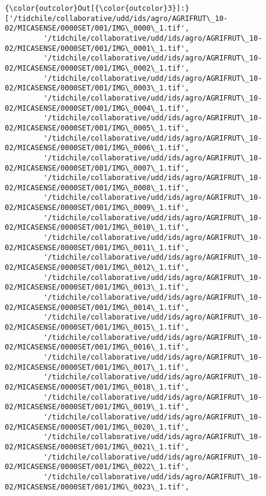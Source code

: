 \documentclass[11pt]{article}
\begin{document}
\begin{Verbatim}[commandchars=\\\{\}]
{\color{outcolor}Out[{\color{outcolor}3}]:} ['/tidchile/collaborative/udd/ids/agro/AGRIFRUT\_10-02/MICASENSE/0000SET/001/IMG\_0000\_1.tif',
         '/tidchile/collaborative/udd/ids/agro/AGRIFRUT\_10-02/MICASENSE/0000SET/001/IMG\_0001\_1.tif',
         '/tidchile/collaborative/udd/ids/agro/AGRIFRUT\_10-02/MICASENSE/0000SET/001/IMG\_0002\_1.tif',
         '/tidchile/collaborative/udd/ids/agro/AGRIFRUT\_10-02/MICASENSE/0000SET/001/IMG\_0003\_1.tif',
         '/tidchile/collaborative/udd/ids/agro/AGRIFRUT\_10-02/MICASENSE/0000SET/001/IMG\_0004\_1.tif',
         '/tidchile/collaborative/udd/ids/agro/AGRIFRUT\_10-02/MICASENSE/0000SET/001/IMG\_0005\_1.tif',
         '/tidchile/collaborative/udd/ids/agro/AGRIFRUT\_10-02/MICASENSE/0000SET/001/IMG\_0006\_1.tif',
         '/tidchile/collaborative/udd/ids/agro/AGRIFRUT\_10-02/MICASENSE/0000SET/001/IMG\_0007\_1.tif',
         '/tidchile/collaborative/udd/ids/agro/AGRIFRUT\_10-02/MICASENSE/0000SET/001/IMG\_0008\_1.tif',
         '/tidchile/collaborative/udd/ids/agro/AGRIFRUT\_10-02/MICASENSE/0000SET/001/IMG\_0009\_1.tif',
         '/tidchile/collaborative/udd/ids/agro/AGRIFRUT\_10-02/MICASENSE/0000SET/001/IMG\_0010\_1.tif',
         '/tidchile/collaborative/udd/ids/agro/AGRIFRUT\_10-02/MICASENSE/0000SET/001/IMG\_0011\_1.tif',
         '/tidchile/collaborative/udd/ids/agro/AGRIFRUT\_10-02/MICASENSE/0000SET/001/IMG\_0012\_1.tif',
         '/tidchile/collaborative/udd/ids/agro/AGRIFRUT\_10-02/MICASENSE/0000SET/001/IMG\_0013\_1.tif',
         '/tidchile/collaborative/udd/ids/agro/AGRIFRUT\_10-02/MICASENSE/0000SET/001/IMG\_0014\_1.tif',
         '/tidchile/collaborative/udd/ids/agro/AGRIFRUT\_10-02/MICASENSE/0000SET/001/IMG\_0015\_1.tif',
         '/tidchile/collaborative/udd/ids/agro/AGRIFRUT\_10-02/MICASENSE/0000SET/001/IMG\_0016\_1.tif',
         '/tidchile/collaborative/udd/ids/agro/AGRIFRUT\_10-02/MICASENSE/0000SET/001/IMG\_0017\_1.tif',
         '/tidchile/collaborative/udd/ids/agro/AGRIFRUT\_10-02/MICASENSE/0000SET/001/IMG\_0018\_1.tif',
         '/tidchile/collaborative/udd/ids/agro/AGRIFRUT\_10-02/MICASENSE/0000SET/001/IMG\_0019\_1.tif',
         '/tidchile/collaborative/udd/ids/agro/AGRIFRUT\_10-02/MICASENSE/0000SET/001/IMG\_0020\_1.tif',
         '/tidchile/collaborative/udd/ids/agro/AGRIFRUT\_10-02/MICASENSE/0000SET/001/IMG\_0021\_1.tif',
         '/tidchile/collaborative/udd/ids/agro/AGRIFRUT\_10-02/MICASENSE/0000SET/001/IMG\_0022\_1.tif',
         '/tidchile/collaborative/udd/ids/agro/AGRIFRUT\_10-02/MICASENSE/0000SET/001/IMG\_0023\_1.tif',

\end{Verbatim}
\end{document}
